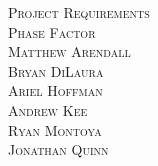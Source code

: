 \begin{titlepage}
\begin{center} 
\vspace*{2cm}
\textsc{\Huge Project Requirements}\\[1cm]
\textsc{\LARGE Phase Factor}\\[13cm]

\textsc{\large Matthew Arendall}\\[0.2cm]
\textsc{\large Bryan DiLaura} \\[0.2cm]
\textsc{\large Ariel Hoffman} \\[0.2cm]
\textsc{\large Andrew Kee} \\[0.2cm]
\textsc{\large Ryan Montoya} \\[0.2cm]
\textsc{\large Jonathan Quinn} \\[0.2cm]

\end{center}
\end{titlepage}